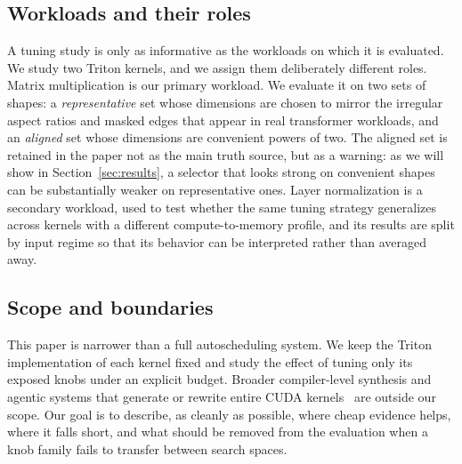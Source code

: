 \subsection{Workloads and their roles}

A tuning study is only as informative as the workloads on which it is evaluated. We study two Triton kernels, and we assign them deliberately different roles. Matrix multiplication is our primary workload. We evaluate it on two sets of shapes: a \emph{representative} set whose dimensions are chosen to mirror the irregular aspect ratios and masked edges that appear in real transformer workloads, and an \emph{aligned} set whose dimensions are convenient powers of two. The aligned set is retained in the paper not as the main truth source, but as a warning: as we will show in Section~\ref{sec:results}, a selector that looks strong on convenient shapes can be substantially weaker on representative ones. Layer normalization is a secondary workload, used to test whether the same tuning strategy generalizes across kernels with a different compute-to-memory profile, and its results are split by input regime so that its behavior can be interpreted rather than averaged away.



\subsection{Scope and boundaries}

This paper is narrower than a full autoscheduling system. We keep the Triton implementation of each kernel fixed and study the effect of tuning only its exposed knobs under an explicit budget. Broader compiler-level synthesis and agentic systems that generate or rewrite entire CUDA kernels~\citep{dai2026cudaagent} are outside our scope. Our goal is to describe, as cleanly as possible, where cheap evidence helps, where it falls short, and what should be removed from the evaluation when a knob family fails to transfer between search spaces.
